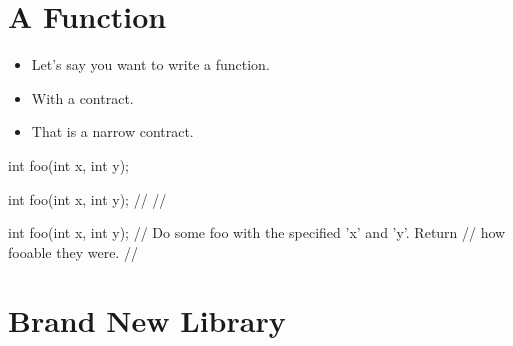 \section{A Function}
\begin{frame}
\end{frame}


\begin{frame}[fragile]
\begin{overprint}
  \begin{itemize}
  \item<1->{Let's say you want to write a function.}
  \item<3->{With a contract.}
  \item<5->{That is a narrow contract.}
  \end{itemize}
\end{overprint}

\begin{overprint}
\begin{cppcodebox}
int foo(int x, int y);
\end{cppcodebox}

\begin{cppcodebox}
int foo(int x, int y);
  // 
  // 
\end{cppcodebox}

\begin{cppcodebox}
int foo(int x, int y);
  // Do some foo with the specified 'x' and 'y'.  Return
  // how fooable they were. 
  // 
\end{cppcodebox}

\end{overprint}
\end{frame}

\section{Brand New Library}
\begin{frame}
\end{frame}


